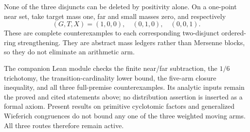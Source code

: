 None of the three disjuncts can be deleted by positivity alone.  On a
one-point near set, take target mass one, far and small masses zero, and
respectively
\[
       (G,T,X)=(1,0,0),\quad(0,1,0),\quad(0,0,1).
\]
These are complete counterexamples to each corresponding two-disjunct
ordered-ring strengthening.  They are abstract mass ledgers rather than
Mersenne blocks, so they do not eliminate an arithmetic arm.

The companion Lean module checks the finite near/far subtraction, the
$1/6$ trichotomy, the transition-cardinality lower bound, the five-arm
closure inequality, and all three full-premise counterexamples.  Its
analytic inputs remain the proved and cited statements above; no
distribution assertion is inserted as a formal axiom.  Present results on
primitive cyclotomic factors and generalized Wieferich congruences
\cite{GranvillePrimitive2012,FelliniMurty2026,FalkHarringtonJones2026}
do not bound any one of the three weighted moving arms.  All three routes
therefore remain active.

